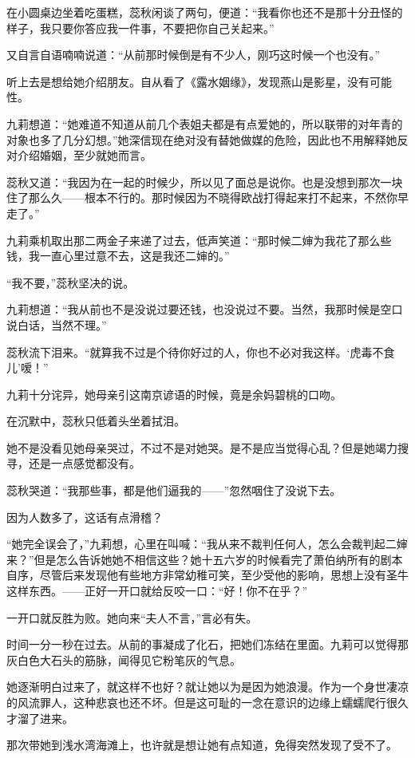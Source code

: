 \par 在小圆桌边坐着吃蛋糕，蕊秋闲谈了两句，便道：“我看你也还不是那十分丑怪的样子，我只要你答应我一件事，不要把你自己关起来。”
\par 又自言自语喃喃说道：“从前那时候倒是有不少人，刚巧这时候一个也没有。”
\par 听上去是想给她介绍朋友。自从看了《露水姻缘》，发现燕山是影星，没有可能性。
\par 九莉想道：“她难道不知道从前几个表姐夫都是有点爱她的，所以联带的对年青的对象也多了几分幻想。”她深信现在绝对没有替她做媒的危险，因此也不用解释她反对介绍婚姻，至少就她而言。
\par 蕊秋又道：“我因为在一起的时候少，所以见了面总是说你。也是没想到那次一块住了那么久——根本不行的。那时候因为不晓得欧战打得起来打不起来，不然你早走了。”
\par 九莉乘机取出那二两金子来递了过去，低声笑道：“那时候二婶为我花了那么些钱，我一直心里过意不去，这是我还二婶的。”
\par “我不要，”蕊秋坚决的说。
\par 九莉想道：“我从前也不是没说过要还钱，也没说过不要。当然，我那时候是空口说白话，当然不理。”
\par 蕊秋流下泪来。“就算我不过是个待你好过的人，你也不必对我这样。‘虎毒不食儿’嗳！”
\par 九莉十分诧异，她母亲引这南京谚语的时候，竟是余妈碧桃的口吻。
\par 在沉默中，蕊秋只低着头坐着拭泪。
\par 她不是没看见她母亲哭过，不过不是对她哭。是不是应当觉得心乱？但是她竭力搜寻，还是一点感觉都没有。
\par 蕊秋哭道：“我那些事，都是他们逼我的——”忽然咽住了没说下去。
\par 因为人数多了，这话有点滑稽？
\par “她完全误会了，”九莉想，心里在叫喊：“我从来不裁判任何人，怎么会裁判起二婶来？”但是怎么告诉她她不相信这些？她十五六岁的时候看完了萧伯纳所有的剧本自序，尽管后来发现他有些地方非常幼稚可笑，至少受他的影响，思想上没有圣牛这样东西。——正好一开口就给反咬一口：“好！你不在乎？”
\par 一开口就反胜为败。她向来“夫人不言，”言必有失。
\par 时间一分一秒在过去。从前的事凝成了化石，把她们冻结在里面。九莉可以觉得那灰白色大石头的筋脉，闻得见它粉笔灰的气息。
\par 她逐渐明白过来了，就这样不也好？就让她以为是因为她浪漫。作为一个身世凄凉的风流罪人，这种悲哀也还不坏。但是这可耻的一念在意识的边缘上蠕蠕爬行很久才溜了进来。
\par 那次带她到浅水湾海滩上，也许就是想让她有点知道，免得突然发现了受不了。
